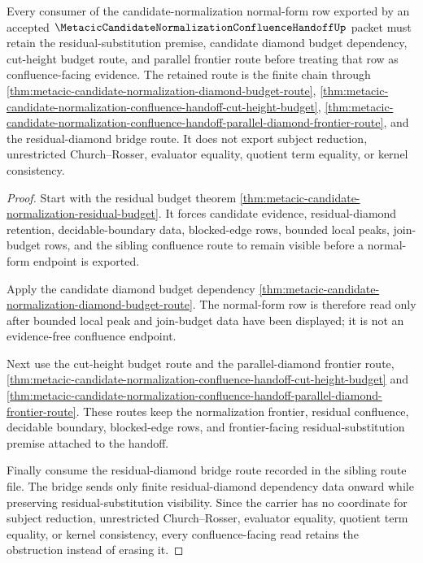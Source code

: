 \begin{theorem}
\label{thm:metacic-candidate-normalization-confluence-handoff-obstruction-retention}
Every consumer of the candidate-normalization normal-form row exported by an
accepted $\MetacicCandidateNormalizationConfluenceHandoffUp$ packet must retain
the residual-substitution premise, candidate diamond budget dependency,
cut-height budget route, and parallel frontier route before treating that row
as confluence-facing evidence. The retained route is the finite chain through
\autoref{thm:metacic-candidate-normalization-diamond-budget-route},
\autoref{thm:metacic-candidate-normalization-confluence-handoff-cut-height-budget},
\autoref{thm:metacic-candidate-normalization-confluence-handoff-parallel-diamond-frontier-route},
and the residual-diamond bridge route. It does not export subject reduction,
unrestricted Church--Rosser, evaluator equality, quotient term equality, or
kernel consistency.
\end{theorem}
\begin{proof}
Start with the residual budget theorem
\autoref{thm:metacic-candidate-normalization-residual-budget}. It forces
candidate evidence, residual-diamond retention, decidable-boundary data,
blocked-edge rows, bounded local peaks, join-budget rows, and the sibling
confluence route to remain visible before a normal-form endpoint is exported.

Apply the candidate diamond budget dependency
\autoref{thm:metacic-candidate-normalization-diamond-budget-route}. The
normal-form row is therefore read only after bounded local peak and join-budget
data have been displayed; it is not an evidence-free confluence endpoint.

Next use the cut-height budget route and the parallel-diamond frontier route,
\autoref{thm:metacic-candidate-normalization-confluence-handoff-cut-height-budget}
and
\autoref{thm:metacic-candidate-normalization-confluence-handoff-parallel-diamond-frontier-route}.
These routes keep the normalization frontier, residual confluence, decidable
boundary, blocked-edge rows, and frontier-facing residual-substitution premise
attached to the handoff.

Finally consume the residual-diamond bridge route recorded in the sibling
route file. The bridge sends only finite residual-diamond dependency data
onward while preserving residual-substitution visibility. Since the carrier has
no coordinate for subject reduction, unrestricted Church--Rosser, evaluator
equality, quotient term equality, or kernel consistency, every
confluence-facing read retains the obstruction instead of erasing it.
\end{proof}

